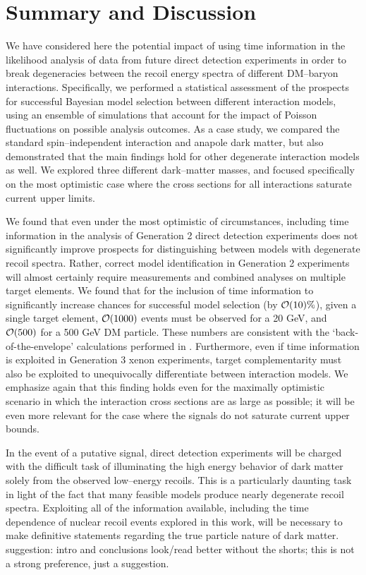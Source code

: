 \documentclass[11pt]{article}
\newcommand{\vgColor}{magenta}
\newcommand{\vg}[1]{{\color{\vgColor} #1}}
\begin{document}
\section{Summary and Discussion}\label{sec:conclusion}
We have considered here the potential impact of using time information in the likelihood analysis of data from future direct detection experiments in order to break degeneracies between the recoil energy spectra of different DM--baryon interactions. Specifically, we performed a statistical assessment of the prospects for successful Bayesian model selection between different interaction models, using an ensemble of simulations that account for the impact of Poisson fluctuations on possible analysis outcomes. As a case study, we compared the standard spin--independent interaction and anapole dark matter, but also demonstrated that the main findings hold for other degenerate interaction models as well. We explored three different dark--matter masses, and focused specifically on the most optimistic case where the cross sections for all interactions saturate current upper limits. 

We found that even under the most optimistic of circumstances, including time information in the analysis of Generation 2 direct detection experiments does not significantly improve prospects for distinguishing between models with degenerate recoil spectra. Rather, correct model identification in Generation 2 experiments will almost certainly require measurements and combined analyses on multiple target elements. We found that for the inclusion of time information to significantly increase chances for successful model selection (by ${\cal O}(10)\%$), given a single target element, ${\cal O}(1000)$ events must be observed for a 20 GeV, and ${\cal O}(500)$ for a 500 GeV DM particle. These numbers are consistent with the `back-of-the-envelope' calculations performed in \cite{DelNobile:2015nua}. Furthermore, even if time information is exploited in Generation 3 xenon experiments, target complementarity must also be exploited to unequivocally differentiate between interaction models. We emphasize again that this finding holds even for the maximally optimistic scenario in which the interaction cross sections are as large as possible; it will be even more relevant for the case where the signals do not saturate current upper bounds.

In the event of a putative signal, direct detection experiments will be charged with the difficult task of illuminating the high energy behavior of dark matter solely from the observed low--energy recoils. This is a particularly daunting task in light of the fact that many feasible models produce nearly degenerate recoil spectra. Exploiting all of the information available, including the time dependence of nuclear recoil events explored in this work, will be necessary to make definitive statements regarding the true particle nature of dark matter. \vg{suggestion: intro and conclusions look/read better without the shorts; this is not a strong preference, just a suggestion.}
\end{document}
